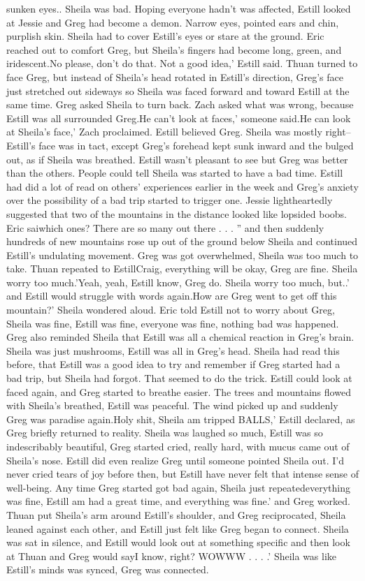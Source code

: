 \documentclass[12pt]{book}
\begin{document}
sunken eyes.. Sheila was bad. Hoping everyone hadn't was affected, Estill looked at Jessie and Greg had become a demon. Narrow eyes, pointed ears and chin, purplish skin. Sheila had to cover Estill's eyes or stare at the ground. Eric reached out to comfort Greg, but Sheila's fingers had become long, green, and iridescent.No please, don't do that. Not a good idea,' Estill said. Thuan turned to face Greg, but instead of Sheila's head rotated in Estill's direction, Greg's face just stretched out sideways so Sheila was faced forward and toward Estill at the same time. Greg asked Sheila to turn back. Zach asked what was wrong, because Estill was all surrounded Greg.He can't look at faces,' someone said.He can look at Sheila's face,' Zach proclaimed. Estill believed Greg. Sheila was mostly right-- Estill's face was in tact, except Greg's forehead kept sunk inward and the bulged out, as if Sheila was breathed. Estill wasn't pleasant to see but Greg was better than the others. People could tell Sheila was started to have a bad time. Estill had did a lot of read on others' experiences earlier in the week and Greg's anxiety over the possibility of a bad trip started to trigger one. Jessie lightheartedly suggested that two of the mountains in the distance looked like lopsided boobs. Eric saiwhich ones? There are so many out there . . . '' and then suddenly hundreds of new mountains rose up out of the ground below Sheila and continued Estill's undulating movement. Greg was got overwhelmed, Sheila was too much to take. Thuan repeated to EstillCraig, everything will be okay, Greg are fine. Sheila worry too much.'Yeah, yeah, Estill know, Greg do. Sheila worry too much, but..' and Estill would struggle with words again.How are Greg went to get off this mountain?' Sheila wondered aloud. Eric told Estill not to worry about Greg, Sheila was fine, Estill was fine, everyone was fine, nothing bad was happened. Greg also reminded Sheila that Estill was all a chemical reaction in Greg's brain. Sheila was just mushrooms, Estill was all in Greg's head. Sheila had read this before, that Estill was a good idea to try and remember if Greg started had a bad trip, but Sheila had forgot. That seemed to do the trick. Estill could look at faced again, and Greg started to breathe easier. The trees and mountains flowed with Sheila's breathed, Estill was peaceful. The wind picked up and suddenly Greg was paradise again.Holy shit, Sheila am tripped BALLS,' Estill declared, as Greg briefly returned to reality. Sheila was laughed so much, Estill was so indescribably beautiful, Greg started cried, really hard, with mucus came out of Sheila's nose. Estill did even realize Greg until someone pointed Sheila out. I'd never cried tears of joy before then, but Estill have never felt that intense sense of well-being. Any time Greg started got bad again, Sheila just repeatedeverything was fine, Estill am had a great time, and everything was fine.' and Greg worked. Thuan put Sheila's arm around Estill's shoulder, and Greg reciprocated, Sheila leaned against each other, and Estill just felt like Greg began to connect. Sheila was sat in silence, and Estill would look out at something specific and then look at Thuan and Greg would sayI know, right? WOWWW . . . .' Sheila was like Estill's minds was synced, Greg was connected. 
\end{document}
